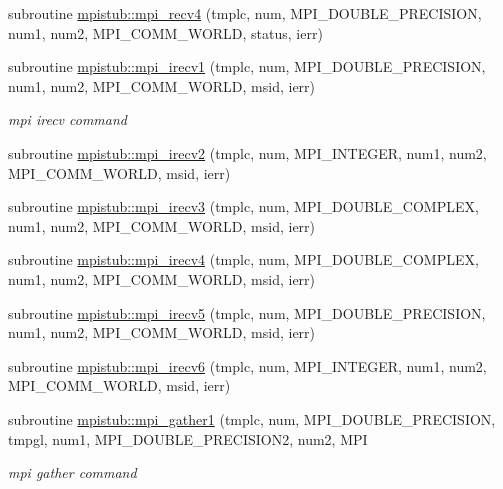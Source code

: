 \begin{DoxyCompactItemize}
\item 
subroutine \mbox{\hyperlink{namespacempistub_ab6b89c7d5ec60b643e3c939f926430c1}{mpistub\+::mpi\+\_\+recv4}} (tmplc, num, M\+P\+I\+\_\+\+D\+O\+U\+B\+L\+E\+\_\+\+P\+R\+E\+C\+I\+S\+I\+ON, num1, num2, M\+P\+I\+\_\+\+C\+O\+M\+M\+\_\+\+W\+O\+R\+LD, status, ierr)
\item 
subroutine \mbox{\hyperlink{namespacempistub_ada728226719e1870c85e45f6594cccbd}{mpistub\+::mpi\+\_\+irecv1}} (tmplc, num, M\+P\+I\+\_\+\+D\+O\+U\+B\+L\+E\+\_\+\+P\+R\+E\+C\+I\+S\+I\+ON, num1, num2, M\+P\+I\+\_\+\+C\+O\+M\+M\+\_\+\+W\+O\+R\+LD, msid, ierr)
\begin{DoxyCompactList}\small\item\em mpi irecv command \end{DoxyCompactList}\item 
subroutine \mbox{\hyperlink{namespacempistub_a3f6d6a1e356cf0bed0327c5b9df47498}{mpistub\+::mpi\+\_\+irecv2}} (tmplc, num, M\+P\+I\+\_\+\+I\+N\+T\+E\+G\+ER, num1, num2, M\+P\+I\+\_\+\+C\+O\+M\+M\+\_\+\+W\+O\+R\+LD, msid, ierr)
\item 
subroutine \mbox{\hyperlink{namespacempistub_ad39ca4d74dbf2a6bc63895fa2503e945}{mpistub\+::mpi\+\_\+irecv3}} (tmplc, num, M\+P\+I\+\_\+\+D\+O\+U\+B\+L\+E\+\_\+\+C\+O\+M\+P\+L\+EX, num1, num2, M\+P\+I\+\_\+\+C\+O\+M\+M\+\_\+\+W\+O\+R\+LD, msid, ierr)
\item 
subroutine \mbox{\hyperlink{namespacempistub_a99d8cacbf221fe5a3829f6dbc22159a6}{mpistub\+::mpi\+\_\+irecv4}} (tmplc, num, M\+P\+I\+\_\+\+D\+O\+U\+B\+L\+E\+\_\+\+C\+O\+M\+P\+L\+EX, num1, num2, M\+P\+I\+\_\+\+C\+O\+M\+M\+\_\+\+W\+O\+R\+LD, msid, ierr)
\item 
subroutine \mbox{\hyperlink{namespacempistub_a42635e07cedd999352dec8ee45a378f5}{mpistub\+::mpi\+\_\+irecv5}} (tmplc, num, M\+P\+I\+\_\+\+D\+O\+U\+B\+L\+E\+\_\+\+P\+R\+E\+C\+I\+S\+I\+ON, num1, num2, M\+P\+I\+\_\+\+C\+O\+M\+M\+\_\+\+W\+O\+R\+LD, msid, ierr)
\item 
subroutine \mbox{\hyperlink{namespacempistub_a38d4bf89b91c8dac22d310c6e73ced41}{mpistub\+::mpi\+\_\+irecv6}} (tmplc, num, M\+P\+I\+\_\+\+I\+N\+T\+E\+G\+ER, num1, num2, M\+P\+I\+\_\+\+C\+O\+M\+M\+\_\+\+W\+O\+R\+LD, msid, ierr)
\item 
subroutine \mbox{\hyperlink{namespacempistub_a3e61dfb24d3caebd2c2983a9e4ab3dfd}{mpistub\+::mpi\+\_\+gather1}} (tmplc, num, M\+P\+I\+\_\+\+D\+O\+U\+B\+L\+E\+\_\+\+P\+R\+E\+C\+I\+S\+I\+ON, tmpgl, num1, M\+P\+I\+\_\+\+D\+O\+U\+B\+L\+E\+\_\+\+P\+R\+E\+C\+I\+S\+I\+O\+N2, num2, M\+PI
\begin{DoxyCompactList}\small\item\em mpi gather command \end{DoxyCompactList}\item 

\end{DoxyCompactItemize}
